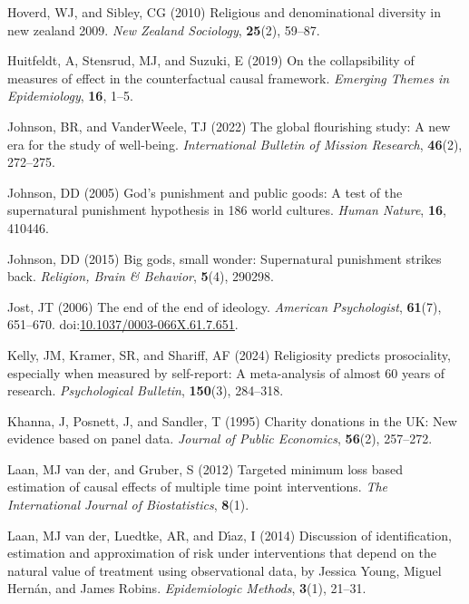 \documentclass[
  single column]{article}
\newlength{\cslhangindent}
\newenvironment{CSLReferences}[2] %
 {\begin{list}{}{%
  \setlength{\itemindent}{0pt}
  \setlength{\leftmargin}{0pt}
  \setlength{\parsep}{0pt}
  \ifodd #1
   \setlength{\leftmargin}{\cslhangindent}
   \setlength{\itemindent}{-1\cslhangindent}
  \fi
  \setlength{\itemsep}{#2\baselineskip}}}
 {\end{list}}
\begin{document}
\begin{CSLReferences}{1}{0}
Hoverd, WJ, and Sibley, CG (2010) Religious and denominational diversity
in new zealand 2009. \emph{New Zealand Sociology}, \textbf{25}(2),
59--87.

Huitfeldt, A, Stensrud, MJ, and Suzuki, E (2019) On the collapsibility
of measures of effect in the counterfactual causal framework.
\emph{Emerging Themes in Epidemiology}, \textbf{16}, 1--5.

Johnson, BR, and VanderWeele, TJ (2022) The global flourishing study: A
new era for the study of well-being. \emph{International Bulletin of
Mission Research}, \textbf{46}(2), 272--275.

Johnson, DD (2005) God{'}s punishment and public goods: A test of the
supernatural punishment hypothesis in 186 world cultures. \emph{Human
Nature}, \textbf{16}, 410446.

Johnson, DD (2015) Big gods, small wonder: Supernatural punishment
strikes back. \emph{Religion, Brain \& Behavior}, \textbf{5}(4), 290298.

Jost, JT (2006) The end of the end of ideology. \emph{American
Psychologist}, \textbf{61}(7), 651--670.
doi:\href{https://doi.org/10.1037/0003-066X.61.7.651}{10.1037/0003-066X.61.7.651}.

Kelly, JM, Kramer, SR, and Shariff, AF (2024) Religiosity predicts
prosociality, especially when measured by self-report: A meta-analysis
of almost 60 years of research. \emph{Psychological Bulletin},
\textbf{150}(3), 284--318.

Khanna, J, Posnett, J, and Sandler, T (1995) Charity donations in the
UK: New evidence based on panel data. \emph{Journal of Public
Economics}, \textbf{56}(2), 257--272.

Laan, MJ van der, and Gruber, S (2012) Targeted minimum loss based
estimation of causal effects of multiple time point interventions.
\emph{The International Journal of Biostatistics}, \textbf{8}(1).

Laan, MJ van der, Luedtke, AR, and Dı́az, I (2014) Discussion of
identification, estimation and approximation of risk under interventions
that depend on the natural value of treatment using observational data,
by {J}essica {Y}oung, {M}iguel {H}ern{á}n, and {J}ames {R}obins.
\emph{Epidemiologic Methods}, \textbf{3}(1), 21--31.


\end{CSLReferences}
\end{document}
